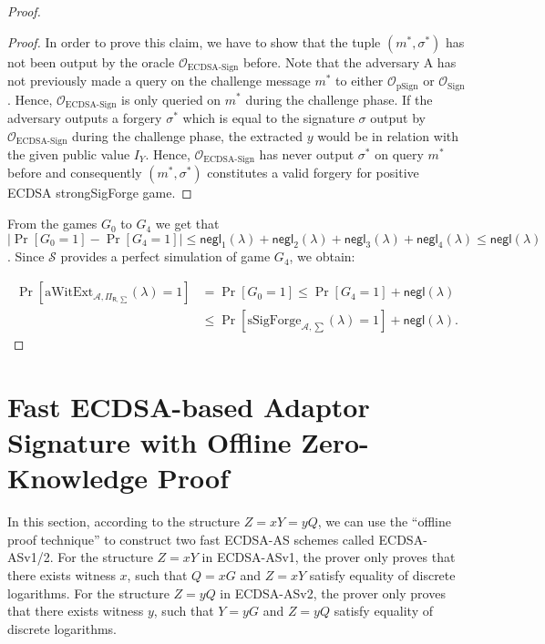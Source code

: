 \documentclass{llncs}
\begin{document}
\begin{proof}
\begin{proof}
In order to prove this claim, we have to show that the tuple $(m^*,\sigma^*)$ has not been output by the oracle $\mathcal{O}_{\text{ECDSA-Sign}}$ before. Note that the adversary A has not previously made a query on the challenge message $m^*$ to either $\mathcal{O}_{\text{pSign}}$ or $\mathcal{O}_{\text{Sign}}$. Hence, $\mathcal{O}_{\text{ECDSA-Sign}}$ is only queried on $m^*$ during the challenge phase. If the adversary outputs a forgery $\sigma^*$ which is equal to the signature $\sigma$ output by $\mathcal{O}_{\text{ECDSA-Sign}}$ during the challenge phase, the extracted $y$ would be in relation with the given public value $I_Y$. Hence, $\mathcal{O}_{\text{ECDSA-Sign}}$ has never output $\sigma^*$ on query $m^*$ before and consequently $(m^*,\sigma^*)$ constitutes a valid forgery for positive ECDSA strongSigForge game.
\end{proof}

From the games $G_0$ to $G_4$ we get that $|\Pr[G_0 = 1] -\Pr[G_4 = 1]| \leq \mathsf{negl}_1(\lambda)+  \mathsf{negl}_2(\lambda)+  \mathsf{negl}_3(\lambda)+  \mathsf{negl}_4(\lambda)\leq \mathsf{negl}(\lambda)$. Since $\mathcal{S}$ provides a perfect simulation of game $G_4$, we obtain:

\begin{equation*}
\begin{aligned}
\Pr[\text{aWitExt}_{\mathcal{A},\Pi_{\mathsf{R},\sum}}(\lambda) = 1] &= \Pr[G_0 = 1]\leq \Pr[G_4=1]+\mathsf{negl}(\lambda)\\
&\leq \Pr[\text{sSigForge}_{\mathcal{A},\sum}(\lambda) = 1] + \mathsf{negl}(\lambda).
\end{aligned}
\end{equation*}
\end{proof}

\section{Fast ECDSA-based Adaptor Signature with Offline Zero-Knowledge Proof}

In this section, according to the structure $Z=xY=yQ$, we can use the ``offline proof technique'' to construct two fast ECDSA-AS schemes called ECDSA-ASv1/2. For the structure $Z=xY$ in ECDSA-ASv1, the prover only proves that there exists witness $x$, such that $Q=xG$ and $Z=xY$ satisfy equality of discrete logarithms. For the structure $Z=yQ$ in ECDSA-ASv2, the prover only proves that there exists witness $y$, such that $Y=yG$ and $Z=yQ$ satisfy equality of discrete logarithms. 
\end{document}
